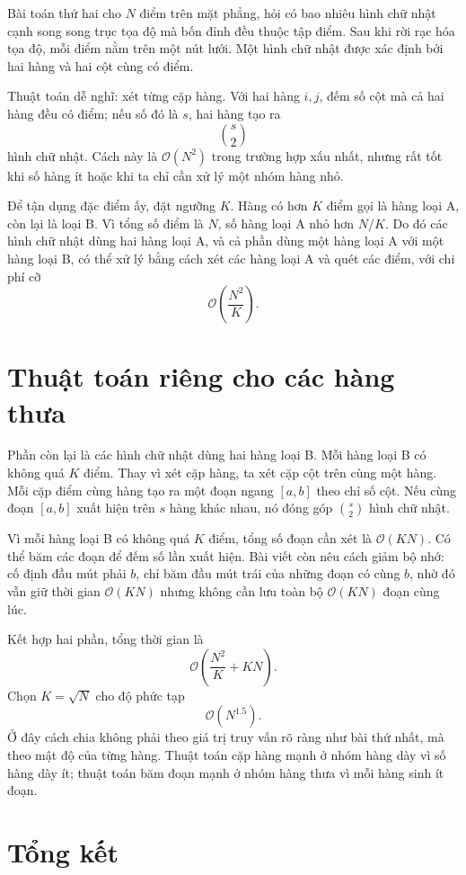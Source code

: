 \documentclass[11pt]{article}
\newcommand{\Oh}{\mathcal{O}}
\begin{document}
Bài toán thứ hai cho \(N\) điểm trên mặt phẳng, hỏi có bao nhiêu hình chữ nhật
cạnh song song trục tọa độ mà bốn đỉnh đều thuộc tập điểm. Sau khi rời rạc
hóa tọa độ, mỗi điểm nằm trên một nút lưới. Một hình chữ nhật được xác định
bởi hai hàng và hai cột cùng có điểm.

Thuật toán dễ nghĩ: xét từng cặp hàng. Với hai hàng \(i,j\), đếm số cột mà
cả hai hàng đều có điểm; nếu số đó là \(s\), hai hàng tạo ra
\[
  \binom{s}{2}
\]
hình chữ nhật. Cách này là \(\Oh(N^2)\) trong trường hợp xấu nhất, nhưng rất
tốt khi số hàng ít hoặc khi ta chỉ cần xử lý một nhóm hàng nhỏ.

Để tận dụng đặc điểm ấy, đặt ngưỡng \(K\). Hàng có hơn \(K\) điểm gọi là hàng
loại A, còn lại là loại B. Vì tổng số điểm là \(N\), số hàng loại A nhỏ hơn
\(N/K\). Do đó các hình chữ nhật dùng hai hàng loại A, và cả phần dùng một
hàng loại A với một hàng loại B, có thể xử lý bằng cách xét các hàng loại A
và quét các điểm, với chi phí cỡ
\[
  \Oh\left(\frac{N^2}{K}\right).
\]

\section{Thuật toán riêng cho các hàng thưa}

Phần còn lại là các hình chữ nhật dùng hai hàng loại B. Mỗi hàng loại B có
không quá \(K\) điểm. Thay vì xét cặp hàng, ta xét cặp cột trên cùng một
hàng. Mỗi cặp điểm cùng hàng tạo ra một đoạn ngang \([a,b]\) theo chỉ số cột.
Nếu cùng đoạn \([a,b]\) xuất hiện trên \(s\) hàng khác nhau, nó đóng góp
\(\binom{s}{2}\) hình chữ nhật.

Vì mỗi hàng loại B có không quá \(K\) điểm, tổng số đoạn cần xét là
\(\Oh(KN)\). Có thể băm các đoạn để đếm số lần xuất hiện. Bài viết còn nêu
cách giảm bộ nhớ: cố định đầu mút phải \(b\), chỉ băm đầu mút trái của những
đoạn có cùng \(b\), nhờ đó vẫn giữ thời gian \(\Oh(KN)\) nhưng không cần lưu
toàn bộ \(\Oh(KN)\) đoạn cùng lúc.

Kết hợp hai phần, tổng thời gian là
\[
  \Oh\left(\frac{N^2}{K}+KN\right).
\]
Chọn \(K=\sqrt{N}\) cho độ phức tạp
\[
  \Oh(N^{1.5}).
\]
Ở đây cách chia không phải theo giá trị truy vấn rõ ràng như bài thứ nhất, mà
theo mật độ của từng hàng. Thuật toán cặp hàng mạnh ở nhóm hàng dày vì số
hàng dày ít; thuật toán băm đoạn mạnh ở nhóm hàng thưa vì mỗi hàng sinh ít
đoạn.

\section{Tổng kết}
\end{document}
